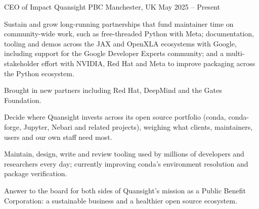 
\begin{cventries}

\cventry
{CEO of Impact}
{Quansight PBC}
{Manchester, UK}
{May 2025 -- Present}
{
\begin{cvitems}
  \item {Sustain and grow long-running partnerships that fund maintainer time on community-wide work, such as free-threaded Python with Meta; documentation, tooling and demos across the JAX and OpenXLA ecosystems with Google, including support for the Google Developer Experts community; and a multi-stakeholder effort with NVIDIA, Red Hat and Meta to improve packaging across the Python ecosystem.}
  \item {Brought in new partners including Red Hat, DeepMind and the Gates Foundation.}
  \item {Decide where Quansight invests across its open source portfolio (conda, conda-forge, Jupyter, Nebari and related projects), weighing what clients, maintainers, users and our own staff need most.}
  \item {Maintain, design, write and review tooling used by millions of developers and researchers every day; currently improving conda's environment resolution and package verification.}
  \item {Answer to the board for both sides of Quansight's mission as a Public Benefit Corporation: a sustainable business and a healthier open source ecosystem.}
\end{cvitems}
}


\end{cventries}
